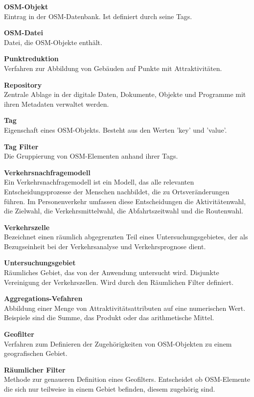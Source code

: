 \documentclass[parskip=full]{scrartcl} %
\begin{document}
\textbf{OSM-Objekt}\\
Eintrag in der OSM-Datenbank. Ist definiert durch seine Tags.

\textbf{OSM-Datei}\\
Datei, die OSM-Objekte enthält.

\textbf{Punktreduktion}\\
Verfahren zur Abbildung von Gebäuden auf Punkte mit Attraktivitäten.

\textbf{Repository}\\
Zentrale Ablage in der digitale Daten, Dokumente, Objekte und Programme mit ihren Metadaten verwaltet werden.

\textbf{Tag}\\
Eigenschaft eines OSM-Objekts. Besteht aus den Werten 'key' und 'value'.

\textbf{Tag Filter}\\
Die Gruppierung von OSM-Elementen anhand ihrer Tags.

\textbf{Verkehrsnachfragemodell}\\
Ein Verkehrsnachfragemodell ist ein Modell, das alle relevanten Entscheidungsprozesse der Menschen nachbildet, die zu Ortsveränderungen führen. Im Personenverkehr umfassen diese Entscheidungen die Aktivitätenwahl, die Zielwahl, die Verkehrsmittelwahl, die Abfahrtszeitwahl und die Routenwahl.

\textbf{Verkehrszelle}\\
Bezeichnet einen räumlich abgegrenzten Teil eines Untersuchungsgebietes, der als Bezugseinheit bei der Verkehrsanalyse und Verkehrsprognose dient.

\textbf{Untersuchungsgebiet}\\
Räumliches Gebiet, das von der Anwendung untersucht wird. Disjunkte Vereinigung der Verkehrszellen. Wird durch den Räumlichen Filter definiert.

\textbf{Aggregations-Vefahren}\\
Abbildung einer Menge von Attraktivitätsattributen auf eine numerischen Wert. Beispiele sind die Summe, das Produkt oder das arithmetische Mittel.

\textbf{Geofilter}\\
Verfahren zum Definieren der Zugehörigkeiten von OSM-Objekten zu einem geografischen Gebiet.

\textbf{Räumlicher Filter}\\
Methode zur genaueren Definition eines Geofilters. Entscheidet ob OSM-Elemente die sich nur teilweise in einem Gebiet befinden, diesem zugehörig sind.
\end{document}
